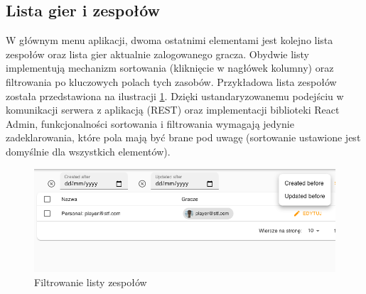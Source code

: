 \subsection{Lista gier i zespołów}
W głównym menu aplikacji, dwoma ostatnimi elementami jest kolejno lista zespołów oraz lista gier aktualnie zalogowanego gracza. Obydwie listy implementują mechanizm sortowania (kliknięcie w nagłówek kolumny) oraz filtrowania po kluczowych polach tych zasobów. Przykładowa lista zespołów została przedstawiona na ilustracji \ref{fig:list-filters}.
Dzięki ustandaryzowanemu podejściu w komunikacji serwera z aplikacją (REST) oraz implementacji biblioteki React Admin, funkcjonalności sortowania i filtrowania wymagają jedynie zadeklarowania, które pola mają być brane pod uwagę (sortowanie ustawione jest domyślnie dla wszystkich elementów).

\begin{figure}[h!]
  \centering
    \includegraphics[width=\textwidth]{images/player/listFilters.png}
  \caption{Filtrowanie listy zespołów}
  \label{fig:list-filters}
\end{figure}
